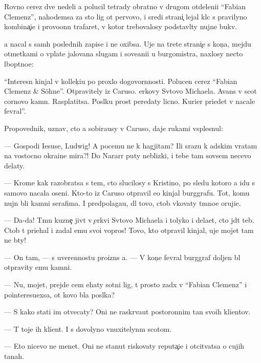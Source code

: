 \documentclass[10pt]{book}
\begin{document}
Rovno cerez dve nedeli {\y}a polucil tetrady obratno v drugom otdeleni{\y}i ``Fabian Clemenz'', nahod{\ia}{\x}emsa za sto lig ot pervovo, i sredi strani{\c} lejal kl{\io}c s pravilyno{\y} kombina{\c}i{\y}e{\y} i provo{\x}onn{\yi}{\y} trafaret, v kotor{\yi}{\y} trebovalosy podstavl{\ia}ty nujn{\yi}{\y}e bukv{\yi}.

{\Y}a nacal s sam{\yi}h poslednih zapise{\y} i ne oxibsa. Uje na tret{\y}e{\y} strani{\c}e s kon{\c}a, mejdu otmetkami o v{\yi}plate jalovan{\y}a slugam i sove{\x}ani{\y}i u burgomistra, naxlosy necto l{\io}bop{\yi}tno{\y}e:

``Interesn{\yi}{\y} kinjal v kollek{\c}i{\y}u po proxlo{\y} dogovor{\e}nnosti. Polucen cerez ``Fabian Clemenz \& Söhne''. Otpravitely iz Caruso. {\C}erkovy Sv{\ia}tovo Michaela. Avans v scot cornovo kamn{\ia}. Rasplatitsa. Pos{\yi}lku pros{\ia}t peredaty licno. Kurier pri{\y}edet v nacale fevral{\ia}''.



Pro\-po\-ved\-nik, uznav, cto {\y}a sobira{\y}usy v Caruso, daje rukami vsplesnul:

— Gospodi Iesuse, Ludwig! A pocemu ne k hagjitam? Ili srazu k adskim vratam na vostocno{\y} okra{\y}ine mira?! Do Nararr{\yi} puty neblizki{\y}, i tebe tam sovsem necevo delaty.

— Krome kak razobratsa s tem, cto slucilosy s Kristino{\y}, po sledu kotoro{\y} {\y}a idu s samovo nacala oseni. Kto-to iz Caruso otpravil {\y}e{\y}o kinjal burggrafu. Tot, komu nujn{\yi} b{\yi}li kamni serafima. I predpolaga{\y}u, dl{\ia} tovo, ctob{\yi} v{\yi}kovaty t{\e}mno{\y}e oruji{\y}e.

— Da-da! T{\e}mn{\yi}{\y} kuzne{\c} jiv{\e}t v {\c}erkvi Sv{\ia}tovo Michaela i tolyko i dela{\y}et, cto jd{\e}t teb{\ia}. Ctob{\yi} t{\yi} pri{\y}ehal i zadal {\y}emu svo{\y}i vopros{\yi}! Tovo, kto otpravil kinjal, uje mojet tam ne b{\yi}ty!

— On tam, — s uverennost{\y}u proizn{\e}s {\y}a. — V kon{\c}e fevral{\ia} burggraf doljen b{\yi}l otpravity {\y}emu kamni.

— Nu, mojet, prejde cem {\y}ehaty sotni lig, t{\yi} prosto za{\y}d{\e}x v ``Fabian Clemenz'' i pointeresu{\y}exsa, ot kovo b{\yi}la pos{\yi}lka?

— S kako{\y} stati im otvecaty? Oni ne raskr{\yi}va{\y}ut postoronnim ta{\y}n{\yi} svo{\y}ih klientov.

— T{\yi} toje ih klient. I s dovolyno vnuxitelyn{\yi}m scotom.

— Eto nicevo ne men{\ia}{\y}et. Oni ne stanut riskovaty reputa{\c}i{\y}e{\y} i otcit{\yi}vatsa o cujih ta{\y}nah.
\end{document}
